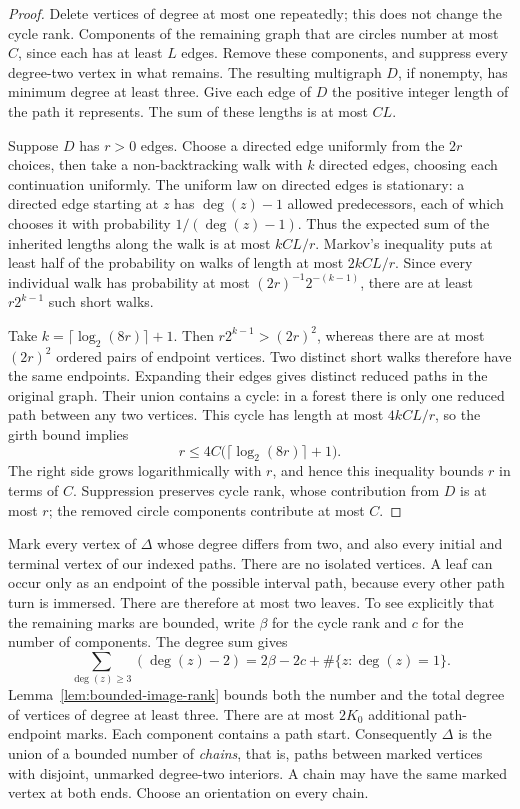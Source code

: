 \begin{proof}
Delete vertices of degree at most one repeatedly; this does not change
the cycle rank.  Components of the remaining graph that are circles
number at most $C$, since each has at least $L$ edges.  Remove these
components, and suppress every degree-two vertex in what remains.
The resulting multigraph $D$, if nonempty, has minimum degree at least
three.  Give each edge of $D$ the positive integer length of the path
it represents.  The sum of these lengths is at most $CL$.

Suppose $D$ has $r>0$ edges.  Choose a directed edge uniformly from
the $2r$ choices, then take a non-backtracking walk with $k$ directed
edges, choosing each continuation uniformly.  The uniform law on
directed edges is stationary: a directed edge starting at $z$ has
$\deg(z)-1$ allowed predecessors, each of which chooses it with
probability $1/(\deg(z)-1)$.  Thus the expected sum of the inherited
lengths along the walk is at most $kCL/r$.  Markov's inequality puts
at least half of the probability on walks of length at most
$2kCL/r$.  Since every individual walk has probability at most
$(2r)^{-1}2^{-(k-1)}$, there are at least $r2^{k-1}$ such short walks.

Take $k=\lceil\log_2(8r)\rceil+1$.  Then $r2^{k-1}>(2r)^2$,
whereas there are at most $(2r)^2$ ordered pairs of endpoint vertices.
Two distinct short walks therefore have the same endpoints.  Expanding
their edges gives distinct reduced paths in the original graph.  Their
union contains a cycle: in a forest there is only one reduced path
between any two vertices.  This cycle has length at most $4kCL/r$,
so the girth bound implies
\[
 r\leq4C\bigl(\lceil\log_2(8r)\rceil+1\bigr).
\]
The right side grows logarithmically with $r$, and hence this inequality
bounds $r$ in terms of $C$.  Suppression preserves cycle rank, whose
contribution from $D$ is at most $r$; the removed circle components
contribute at most $C$.
\end{proof}

Mark every vertex of $\Delta$ whose degree differs from two, and also
every initial and terminal vertex of our indexed paths.  There are no
isolated vertices.  A leaf can occur only as an endpoint of the possible
interval path, because every other path turn is immersed.  There are
therefore at most two leaves.  To see explicitly that the remaining
marks are bounded, write $\beta$ for the cycle rank and $c$ for the
number of components.  The degree sum gives
\[
 \sum_{\deg(z)\geq3}(\deg(z)-2)
 =2\beta-2c+\#\{z:\deg(z)=1\}.
\]
Lemma~\ref{lem:bounded-image-rank} bounds both the number and the total
degree of vertices of degree at least three.  There are at most $2K_0$
additional path-endpoint marks.  Each component contains a path start.
Consequently $\Delta$ is the union of a bounded number of \emph{chains},
that is, paths between marked vertices with disjoint, unmarked
degree-two interiors.  A chain may have the same marked vertex at both
ends.  Choose an orientation on every chain.

